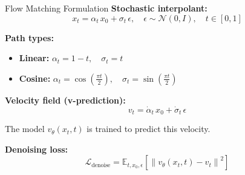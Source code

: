 \documentclass[aspectratio=169, 10pt]{beamer}
\newcommand{\loss}{\mathcal{L}}
\newcommand{\E}{\mathbb{E}}
\begin{document}
\begin{frame}{Flow Matching Formulation}
\textbf{Stochastic interpolant:}
\begin{equation}
  x_t = \alpha_t \, x_0 + \sigma_t \, \epsilon, \quad \epsilon \sim \mathcal{N}(0, I), \quad t \in [0, 1]
\end{equation}

\textbf{Path types:}
\begin{itemize}
  \item \textbf{Linear:} $\alpha_t = 1 - t, \quad \sigma_t = t$
  \item \textbf{Cosine:} $\alpha_t = \cos\!\left(\frac{\pi t}{2}\right), \quad \sigma_t = \sin\!\left(\frac{\pi t}{2}\right)$
\end{itemize}

\vspace{0.5em}
\textbf{Velocity field (v-prediction):}
\begin{equation}
  v_t = \dot{\alpha}_t \, x_0 + \dot{\sigma}_t \, \epsilon
\end{equation}

The model $v_\theta(x_t, t)$ is trained to predict this velocity.

\vspace{0.5em}
\textbf{Denoising loss:}
\begin{equation}
  \loss_{\text{denoise}} = \E_{t, x_0, \epsilon}\left[\left\| v_\theta(x_t, t) - v_t \right\|^2\right]
\end{equation}
\end{frame}
\end{document}
